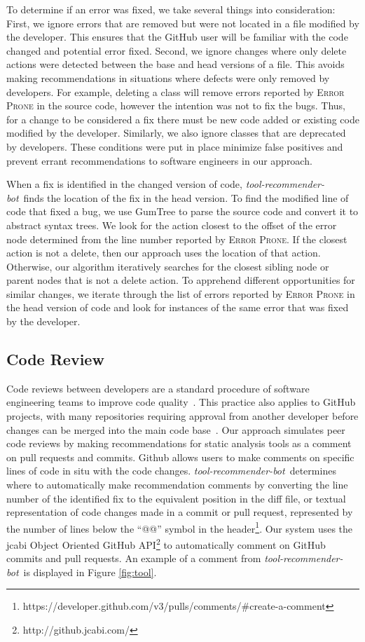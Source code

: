 \documentclass[sigconf,review,anonymous]{acmart}
\newcommand{\tool}{\textsl{tool-recommender-bot}}
\begin{document}
To determine if an error was fixed, we take several things into consideration: First, we ignore errors that are removed but were not located in a file modified by the developer. This ensures that the GitHub user will be familiar with the code changed and potential error fixed. Second, we ignore changes where only delete actions were detected between the base and head versions of a file. This avoids making recommendations in situations where defects were only removed by developers. For example, deleting a class will remove errors reported by \textsc{Error Prone} in the source code, however the intention was not to fix the bugs. Thus, for a change to be considered a fix there must be new code added or existing code modified by the developer. Similarly, we also ignore classes that are deprecated by developers. These conditions were put in place minimize false positives and prevent errant recommendations to software engineers in our approach.

When a fix is identified in the changed version of code, \tool~finds the location of the fix in the head version. To find the modified line of code that fixed a bug, we use GumTree to parse the source code and convert it to abstract syntax trees. We look for the action closest to the offset of the error node determined from the line number reported by \textsc{Error Prone}. If the closest action is not a delete, then our approach uses the location of that action. Otherwise, our algorithm iteratively searches for the closest sibling node or parent nodes that is not a delete action. To apprehend different opportunities for similar changes, we iterate through the list of errors reported by \textsc{Error Prone} in the head version of code and look for instances of the same error that was fixed by the developer.

\subsection{Code Review}

Code reviews between developers are a standard procedure of software engineering teams to improve code quality~\cite{CodeReviewingTrenches}. This practice also applies to GitHub projects, with many repositories requiring approval from another developer before changes can be merged into the main code base~\cite{PullRequestReview}. Our approach simulates peer code reviews by making recommendations for static analysis tools as a comment on pull requests and commits. Github allows users to make comments on specific lines of code in situ with the code changes. \tool~determines where to automatically make recommendation comments by converting the line number of the identified fix to the equivalent position in the diff file, or textual representation of code changes made in a commit or pull request, represented by the number of lines below the ``@@'' symbol in the header\footnote{https://developer.github.com/v3/pulls/comments/\#create-a-comment}. Our system uses the jcabi Object Oriented GitHub API\footnote{http://github.jcabi.com/} to automatically comment on GitHub commits and pull requests. An example of a comment from \tool~is displayed in Figure \ref{fig:tool}.
\end{document}

